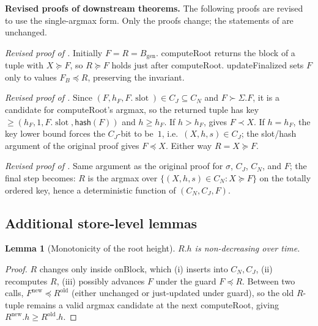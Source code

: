 \documentclass{article}
\newcommand{\genesis}{\ensuremath{B_{\mathrm{gen}}}}
\newcommand{\slot}[0]{\ensuremath{\operatorname{\mathrm{slot}}}}
\newcommand{\hash}{\mathsf{hash}}
\newcommand{\onBlock}{\textsf{onBlock}\xspace}
\newcommand{\updateFinalized}{\textsf{updateFinalized}\xspace}
\newcommand{\computeRoot}{\textsf{computeRoot}\xspace}
\renewcommand{\paragraph}[1]{\vspace{7pt}\noindent\textbf{#1}}
\theoremstyle{plain}
\newtheorem{lemma}{Lemma}
\theoremstyle{definition}
\theoremstyle{remark}
\begin{document}
\paragraph{Revised proofs of downstream theorems.}
The following proofs are revised to use the single-argmax form. Only the proofs change; the statements of  are unchanged.

\emph{Revised proof of .}
Initially $F = R = \genesis$.
\computeRoot returns the block of a tuple with $X \succeq F$, so $R \succeq F$ holds just after \computeRoot.
\updateFinalized sets $F$ only to values $F_B \preceq R$, preserving the invariant.

\emph{Revised proof of .}
Since $(F, h_F, F.\slot) \in C_J \subseteq C_N$ and $F \succ \Sigma.F$, it is a candidate for \computeRoot's argmax, so the returned tuple has key $\geq (h_F, 1, F.\slot, \hash(F))$ and $h \geq h_F$.
If $h > h_F$,  gives $F \prec X$.
If $h = h_F$, the key lower bound forces the $C_J$-bit to be~$1$, i.e.\ $(X, h, s) \in C_J$; the slot/hash argument of the original proof gives $F \preceq X$.
Either way $R = X \succeq F$.

\emph{Revised proof of .}
Same argument as the original proof for $\sigma$, $C_J$, $C_N$, and $F$; the final step becomes: $R$ is the argmax over $\{(X,h,s) \in C_N : X \succeq F\}$ on the totally ordered key, hence a deterministic function of $(C_N, C_J, F)$.

\subsection{Additional store-level lemmas}\label{rev:sec:store-lemmas}

\begin{lemma}[Monotonicity of the root height]\label{rev:lem:Rs-height-monotone}
$R.h$ is non-decreasing over time.
\end{lemma}

\begin{proof}
$R$ changes only inside \onBlock, which (i) inserts into $C_N, C_J$, (ii) recomputes $R$, (iii) possibly advances $F$ under the guard $F \preceq R$.
Between two calls, $F^{\text{new}} \preceq R^{\text{old}}$ (either unchanged or just-updated under guard), so the old $R$-tuple remains a valid argmax candidate at the next \computeRoot, giving $R^{\text{new}}.h \geq R^{\text{old}}.h$.
\end{proof}
\end{document}
